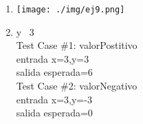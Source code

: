 \documentclass{article}
\begin{document}
\begin{multicols}{2}
\begin{enumerate}
\item \texttt{[image: ./img/ej9.png]}
\item	y  \ 3\\
Test Case \#1: valorPostitivo\\
\hspace*{6mm}entrada x=3,y=3\\
\hspace*{6mm}salida esperada=6\medskip\\
Test Case \#2: valorNegativo\\
\hspace*{6mm}entrada x=3,y=-3\\
\hspace*{6mm}salida esperada=0\medskip\\

\end{enumerate}
\end{multicols}
\end{document}
